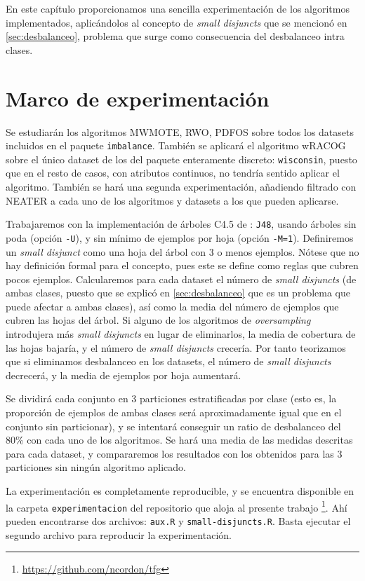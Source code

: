 \label{ch:sdisjuncts}
En este capítulo proporcionamos una sencilla experimentación de los algoritmos implementados, aplicándolos al concepto de 
\textit{small disjuncts} que se mencionó en \ref{sec:desbalanceo}, problema que surge como consecuencia del desbalanceo
intra clases.

\section{Marco de experimentación}
Se estudiarán los algoritmos MWMOTE, RWO, PDFOS sobre todos los datasets incluidos en el paquete \texttt{imbalance}. 
También se aplicará el algoritmo wRACOG sobre el único dataset de los del paquete enteramente discreto: \texttt{wisconsin},
puesto que en el resto de casos, con atributos continuos, no tendría sentido aplicar el algoritmo. También se hará una 
segunda experimentación, añadiendo filtrado con NEATER a cada uno de los algoritmos y datasets a los que pueden aplicarse.

Trabajaremos con la implementación de árboles C4.5 de : \texttt{J48}, usando árboles sin poda 
(opción \texttt{-U}), y sin mínimo de ejemplos por hoja (opción \texttt{-M=1}). 
Definiremos un \textit{small disjunct} como una hoja del árbol con 3 o menos ejemplos. Nótese 
que no hay definición formal para el concepto, pues este se define como reglas que cubren pocos ejemplos. Calcularemos para 
cada dataset el número de \textit{small disjuncts} (de ambas clases, puesto que se explicó en \ref{sec:desbalanceo} que 
es un problema que puede afectar a ambas clases), así como la media del número de ejemplos que cubren las hojas del árbol.
Si alguno de los algoritmos de \textit{oversampling} introdujera más \textit{small disjuncts} en lugar de eliminarlos, 
la media de cobertura de las hojas bajaría, y el número de \textit{small disjuncts} crecería. Por tanto teorizamos que si eliminamos 
desbalanceo en los datasets, el número de \textit{small disjuncts} decrecerá, y la media de ejemplos por hoja aumentará.

Se dividirá cada conjunto en 3 particiones estratificadas por clase (esto es, la proporción de ejemplos de ambas
clases será aproximadamente igual que en el conjunto sin particionar), y se intentará conseguir un ratio de desbalanceo del
80\% con cada uno de los algoritmos. Se hará una media de las medidas descritas para cada dataset, y compararemos los 
resultados con los obtenidos para las 3 particiones sin ningún algoritmo aplicado.

La experimentación es completamente reproducible, y se encuentra disponible en la carpeta \texttt{experimentacion} del 
repositorio que aloja al presente trabajo \footnote{\url{https://github.com/ncordon/tfg}}.
Ahí pueden encontrarse dos archivos: \texttt{aux.R} y \texttt{small-disjuncts.R}. Basta ejecutar el segundo archivo
para reproducir la experimentación.

